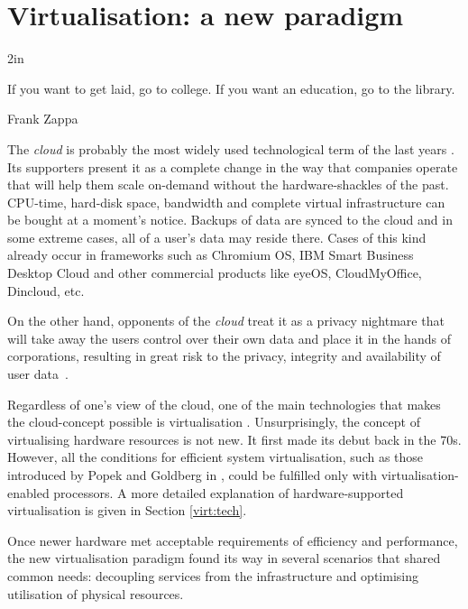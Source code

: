 \chapter{Virtualisation: a new paradigm}\label{virt:paradigm}

\epigraph{2in}{If you want to get laid, go to college. If you want an education, go to the library.}{Frank Zappa}{}

The \emph{cloud} is probably the most widely used technological term of the last years \cite{Buyya:2011:CCP:1971955}. 
Its supporters present it as a complete change in the way that companies operate that will help them scale on-demand without the hardware-shackles of the past. 
CPU-time, hard-disk space, bandwidth and complete virtual infrastructure can be bought at a moment's notice. 
Backups of data are synced to the cloud and in some extreme cases, all of a user's data may reside there.
Cases of this kind already occur in frameworks such as Chromium OS, IBM Smart Business Desktop Cloud and other commercial products like eyeOS, CloudMyOffice, Dincloud, etc. 

On the other hand, opponents of the \emph{cloud} treat it as a privacy nightmare that will take away the users control over their own data and place it in the hands of corporations, resulting in great risk to the privacy, integrity and availability of user data~\cite{amazon_cloud_problem, exposingFHS2011}. %

Regardless of one's view of the cloud, one of the main technologies that makes the cloud-concept possible is virtualisation \cite{Gurav:2010:VKF:1741906.1741957}. Unsurprisingly, the concept of virtualising hardware resources is not new. It first made its debut back in the 70s. However, all the conditions for efficient system virtualisation, such as those introduced by Popek and Goldberg in \cite{popekgoldberg}, could be fulfilled only with virtualisation-enabled processors. A more detailed explanation of hardware-supported virtualisation is given in Section \ref{virt:tech}.%


Once newer hardware met acceptable requirements of efficiency and performance, the new virtualisation paradigm found its way in several scenarios that shared common needs: decoupling services from the infrastructure and optimising utilisation of physical resources.%
 
